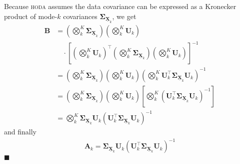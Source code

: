 \documentclass[twocolumn]{article}
\newcommand{\ten}[1]{\underline{\mathbf{#1}}} %
\newcommand{\mat}[1]{\mathbf{#1}} %
\begin{document}
Because \textsc{hoda} assumes the data covariance can be expressed as a
Kronecker product of mode-$k$ covariances
$\mat{\Sigma}_{\ten{X}_k}$, we get
\begin{align*}
	\mat{B} & =
	\left(\bigotimes_k^K\mat{\Sigma}_{\ten{X}_k}\right)\left(\bigotimes_k^K\mat{U}_k\right)
  \\
          & \quad \cdot \left[\left(\bigotimes_k^K\mat{U}_k\right)^\intercal\left(\bigotimes_k^K\mat{\Sigma}_{\ten{X}_k}\right)\left(\bigotimes_k^K\mat{U}_k\right)\right]^{-1}
	\\
	        &
	=\left(\bigotimes_k^K\mat{\Sigma}_{\ten{X}_k}\right)\left(\bigotimes_k^K\mat{U}_k\right)\left(\bigotimes_k^K\mat{U}_k^\intercal\mat{\Sigma}_{\ten{X}_k}\mat{U}_k\right)^{-1} \\
	        &
	=\left(\bigotimes_k^K\mat{\Sigma}_{\ten{X}_k}\right)\left(\bigotimes_k^K\mat{U}_k\right)\left[\bigotimes_k^K\left(\mat{U}_k^\intercal\mat{\Sigma}_{\ten{X}_k}\mat{U}_k\right)^{-1}\right]
	\\
	        & = \bigotimes_k^K \mat{\Sigma}_{\ten{X}_k}
	\mat{U}_k\left(\mat{U}_k^\intercal\mat{\Sigma}_{\ten{X}_k}\mat{U}_k\right)^{-1}
\end{align*}
and finally
\begin{align}
  \mat{A}_k = \mat{\Sigma}_{\ten{X}_k}
	\mat{U}_k\left(\mat{U}_k^\intercal\mat{\Sigma}_{\ten{X}_k}\mat{U}_k\right)^{-1}
\end{align}
$\blacksquare$
\end{document}
